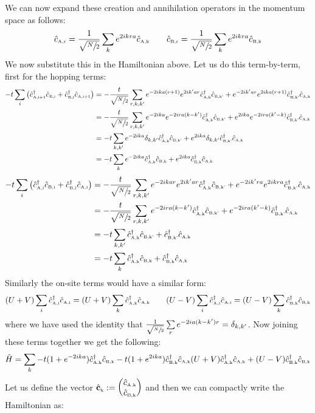 \documentclass[usenames, svgnames, dvipsnames]{scrartcl}
\newcommand{\crai}{\hat{c}\tund{A,i}^\dagger}
\newcommand{\annai}{\hat{c}\tund{A,i}}
\newcommand{\crbi}{\hat{c}\tund{B,i}^\dagger}
\newcommand{\annbi}{\hat{c}\tund{B,i}}
\newcommand{\annar}{\hat{c}\tund{A,r}}
\newcommand{\annbr}{\hat{c}\tund{B,r}}
\newcommand{\crak}{\hat{c}\tund{A,k}^\dagger}
\newcommand{\annak}{\hat{c}\tund{A,k}}
\newcommand{\crbk}{\hat{c}\tund{B,k}^\dagger}
\newcommand{\annbk}{\hat{c}\tund{B,k}}
\newcommand{\crbkd}{\hat{c}\tund{B,k'}^\dagger}
\newcommand{\annbkd}{\hat{c}\tund{B,k'}}
\newcommand{\craip}{\hat{c}\tund{A,i+1}^\dagger}
\newcommand{\annaip}{\hat{c}\tund{A,i+1}}
\newcommand{\tund}[1]{_{\text{\tiny #1}}}
\begin{document}
We can now expand these creation and annihilation operators in the momentum space as follows:
\begin{align*}
    \annar = \frac{1}{\sqrt{\sfrac{N}{2}}}\sum\limits_{k}e^{2ikra} \annak\qquad  \annbr = \frac{1}{\sqrt{\sfrac{N}{2}}}\sum\limits_{k}e^{2ikra} \annbk
\end{align*}
We now substitute this in the Hamiltonian above. Let us do this term-by-term, first for the hopping terms: 
\begin{align*}
    -t\sum\limits_{i}\qty(\craip \annbi +\crbi\annaip  ) &= -\frac{t}{\sqrt{\sfrac{N}{2}}}\sum\limits_{r,k,k'} e^{-2ika(r+1)} e^{2ik'ar} \crak \annbkd + e^{-2ik'ar}e^{2ika(r+1)} \crbkd \annak\\
    &= -\frac{t}{\sqrt{\sfrac{N}{2}}}\sum\limits_{r,k,k'} e^{-2ika}e^{-2ira(k-k')} \crak \annbkd + e^{2ika}e^{-2ira(k'-k)} \crbkd \annak\\
    &= -t\sum\limits_{k,k'} e^{-2ika}\delta_{k,k'} \crak \annbkd + e^{2ika}\delta_{k,k'}\crbkd \annak\\
    &=-t\sum\limits_{k} e^{-2ika} \crak \annbk + e^{2ika}\crbk \annak
\end{align*}
\begin{align*}
    -t\sum\limits_{i}\qty(\crai \annbi +\crbi\annai  ) &= -\frac{t}{\sqrt{\sfrac{N}{2}}}\sum\limits_{r,k,k'} e^{-2ikar} e^{2ik'ar} \crak \annbkd + e^{-2ik'ra}e^{2ikra} \crbkd \annak\\
    &= -\frac{t}{\sqrt{\sfrac{N}{2}}}\sum\limits_{r,k,k'} e^{-2ira(k-k')} \crak \annbkd + e^{-2ira(k'-k)} \crbkd \annak\\
    &= -t\sum\limits_{k,k'}  \crak \annbkd + \crbkd \annak\\
    &=-t\sum\limits_{k}  \crak \annbk + \crbk \annak
\end{align*}
Similarly the on-site terms would have a similar form:
\begin{align*}
    (U+V)\sum\limits_i \crai \annai  = (U+V)\sum\limits_{k} \crak \annak \qquad (U-V)\sum\limits_i \crai \annai  = (U-V)\sum\limits_{k} \crbk \annbk
\end{align*}
where we have used the identity that $\frac{1}{\sqrt{\sfrac{N}{2}}}\sum\limits_{r} e^{-2ia(k-k')r} = \delta_{k,k'}$. Now joining these terms together we get the following: 
\begin{align*}
    \hat{H} = \sum\limits_{k} -t(1+e^{-2ika}) \crak \annbk -t(1+e^{2ika})\crbk \annak (U+V)\crak \annak+(U-V)\crbk \annbk 
\end{align*}
Let us define the vector $\hat{\vb{c}}\tund{k}:= \mqty(\annak\\ \annbk)$ and then we can compactly write the Hamiltonian as: 
\end{document}
